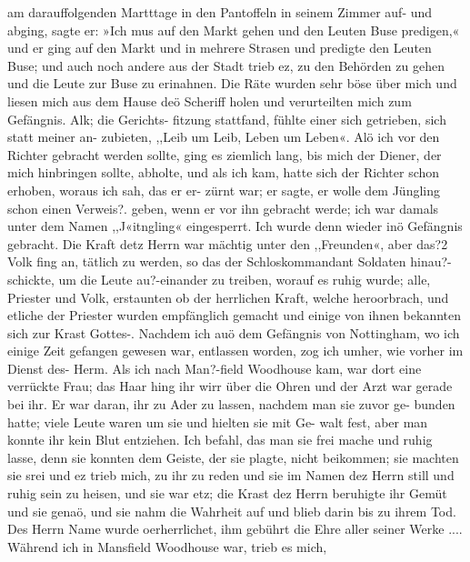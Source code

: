am darauffolgenden Martttage in den Pantoffeln in seinem
Zimmer auf- und abging, sagte er: »Ich mus auf den Markt
gehen und den Leuten Buse predigen,« und er ging auf den Markt
und in mehrere Strasen und predigte den Leuten Buse; und auch
noch andere aus der Stadt trieb ez, zu den Behörden zu gehen
und die Leute zur Buse zu erinahnen. Die Räte wurden sehr
böse über mich und liesen mich aus dem Hause deö Scheriff
holen und verurteilten mich zum Gefängnis. Alk; die Gerichts-
fitzung stattfand, fühlte einer sich getrieben, sich statt meiner an-
zubieten, ,,Leib um Leib, Leben um Leben«. Alö ich vor den
Richter gebracht werden sollte, ging es ziemlich lang, bis mich
der Diener, der mich hinbringen sollte, abholte, und als ich kam,
hatte sich der Richter schon erhoben, woraus ich sah, das er er-
zürnt war; er sagte, er wolle dem Jüngling schon einen Verweis?.
geben, wenn er vor ihn gebracht werde; ich war damals unter
dem Namen ,,J«itngling« eingesperrt. Ich wurde denn wieder
inö Gefängnis gebracht. Die Kraft detz Herrn war mächtig
unter den ,,Freunden«, aber das?2 Volk fing an, tätlich zu
werden, so das der Schloskommandant Soldaten hinau?-schickte,
um die Leute au?-einander zu treiben, worauf es ruhig wurde;
alle, Priester und Volk, erstaunten ob der herrlichen Kraft, welche
heroorbrach, und etliche der Priester wurden empfänglich gemacht
und einige von ihnen bekannten sich zur Krast Gottes-.
Nachdem ich auö dem Gefängnis von Nottingham, wo ich
einige Zeit gefangen gewesen war, entlassen worden, zog ich
umher, wie vorher im Dienst des- Herm. Als ich nach Man?-field
Woodhouse kam, war dort eine verrückte Frau; das Haar hing
ihr wirr über die Ohren und der Arzt war gerade bei ihr. Er
war daran, ihr zu Ader zu lassen, nachdem man sie zuvor ge-
bunden hatte; viele Leute waren um sie und hielten sie mit Ge-
walt fest, aber man konnte ihr kein Blut entziehen. Ich befahl,
das man sie frei mache und ruhig lasse, denn sie konnten dem
Geiste, der sie plagte, nicht beikommen; sie machten sie srei und
ez trieb mich, zu ihr zu reden und sie im Namen dez Herrn still
und ruhig sein zu heisen, und sie war etz; die Krast dez Herrn
beruhigte ihr Gemüt und sie genaö, und sie nahm die Wahrheit
auf und blieb darin bis zu ihrem Tod. Des Herrn Name wurde
oerherrlichet, ihm gebührt die Ehre aller seiner Werke ....
Während ich in Mansfield Woodhouse war, trieb es mich,


